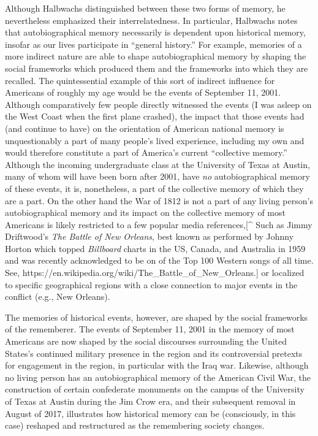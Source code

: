 Although Halbwachs distinguished between these two forms of memory, he
nevertheless emphasized their interrelatedness. In particular, Halbwachs
notes that autobiographical memory necessarily is dependent upon
historical memory, insofar as our lives participate in ``general
history.''\autocite[52]{halbwachs1980} For example, memories of a more
indirect nature are able to shape autobiographical memory by shaping the
social frameworks which produced them and the frameworks into which they
are recalled. The quintessential example of this sort of indirect
influence for Americans of roughly my age would be the events of
September 11, 2001. Although comparatively few people directly witnessed
the events (I was asleep on the West Coast when the first plane
crashed), the impact that those events had (and continue to have) on the
orientation of American national memory is unquestionably a part of many
people's lived experience, including my own and would therefore
constitute a part of America's current ``collective memory.'' Although
the incoming undergraduate class at the University of Texas at Austin,
many of whom will have been born after 2001, have \emph{no}
autobiographical memory of these events, it is, nonetheless, a part of
the collective memory of which they are a part. On the other hand the
War of 1812 is not a part of any living person's autobiographical memory
and its impact on the collective memory of most Americans is likely
restricted to a few popular media references,{[}\^{} Such as Jimmy
Driftwood's \emph{The Battle of New Orleans}, best known as performed by
Johnny Horton which topped \emph{Billboard} charts in the US, Canada,
and Australia in 1959 and was recently acknowledged to be on of the Top
100 Western songs of all time. See,
https://en.wikipedia.org/wiki/The\_Battle\_of\_New\_Orleans.{]} or
localized to specific geographical regions with a close connection to
major events in the conflict (e.g., New Orleans).

The memories of historical events, however, are shaped by the social
frameworks of the rememberer. The events of September 11, 2001 in the
memory of most Americans are now shaped by the social discourses
surrounding the United States's continued military presence in the
region and its controversial pretexts for engagement in the region, in
particular with the Iraq war. Likewise, although no living person has an
autobiographical memory of the American Civil War, the construction of
certain confederate monuments on the campus of the University of Texas
at Austin during the Jim Crow era, and their subsequent removal in
August of 2017, illustrates how historical memory can be (consciously,
in this case) reshaped and restructured as the remembering society
changes.

